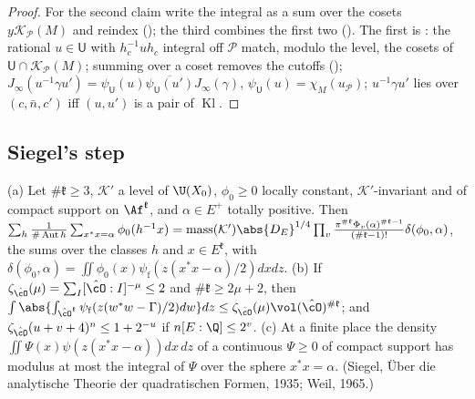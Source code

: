 \begin{proof}
For the second claim write the integral as a sum over the cosets $y\mathcal K_{\mathcal P}(M)$ and
reindex ();
the third combines the first two
(). The first is
: the rational $u\in\mathsf U$
with $h_c^{-1}uh_c$ integral off $\mathcal P$ match, modulo the level, the cosets of $\mathsf U\cap\mathcal
K_{\mathcal P}(M)$; summing over a coset removes the cutoffs
(); $J_\infty(u^{-1}\gamma u')=
\psi_{\mathsf U}(u)\overline{\psi_{\mathsf U}(u')}J_\infty(\gamma)$, $\psi_{\mathsf U}(u)=\chi_M(u_{\mathcal P})$;
$u^{-1}\gamma u'$ lies over $(c,\bar n,c')$ iff $(u,u')$ is a pair of $\operatorname{Kl}$.
\end{proof}

\subsection{Siegel's step}\label{sp-main:ss:siegel}

\begin{fact}
\label{sp-main:fact:siegel}
(a) Let $\#\mathfrak k\ge3$, $\mathcal K'$ a level of $\U(X_0)$, $\phi_0\ge0$ locally constant, $\mathcal K'$-invariant and of
compact support on $\Af^{\mathfrak k}$, and $\alpha\in E^+$ totally positive. Then $\sum_h\frac1{\#\operatorname{Aut}h}
\sum_{x^*x=\alpha}\phi_0(h^{-1}x)=\operatorname{mass}(\mathcal K')\abs{D_E}^{1/4}\prod_v\frac{\pi^{\#\mathfrak k}
\Phi_v(\alpha)^{\#\mathfrak k-1}}{(\#\mathfrak k-1)!}\delta(\phi_0,\alpha)$, the sums over the classes $h$ and
$x\in E^{\mathfrak k}$, with $\delta(\phi_0,\alpha)=\iint\phi_0(x)\psi_{\mathrm f}(z(x^*x-\alpha)/2)dxdz$.
(b) If $\zeta_{\hat\cO}(\mu)=\sum_I[\hat\cO:I]^{-\mu}\le2$ and $\#\mathfrak k\ge2\mu+2$, then
$\int\abs{\int_{\hat\cO^{\mathfrak k}}\psi_{\mathrm f}(z(w^*w-\Gamma)/2)dw}dz\le\zeta_{\hat\cO}(\mu)
\vol(\hat\cO)^{\#\mathfrak k}$; and $\zeta_{\hat\cO}(u+v+4)^n\le1+2^{-u}$ if $n[E:\Q]\le2^v$. (c) At a finite
place the density $\iint\Psi(x)\psi(z(x^*x-\alpha))dx\,dz$ of a continuous $\Psi\ge0$ of compact support
has modulus at most the integral of $\Psi$ over the sphere $x^*x=\alpha$. (Siegel, Über die analytische Theorie
der quadratischen Formen, 1935; Weil, 1965.)
\end{fact}

